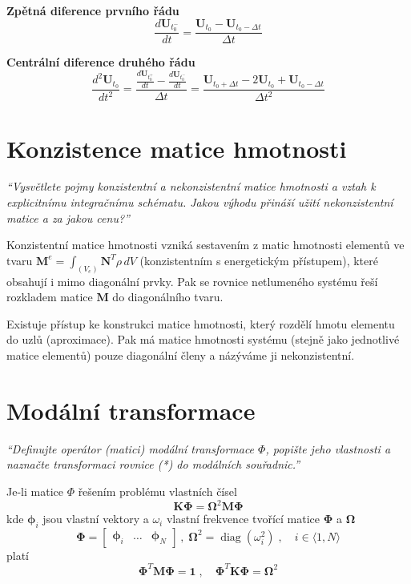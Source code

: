 \documentclass{article}
\begin{document}
	\textbf{Zpětná diference prvního řádu}
	\begin{equation}
		\frac{d\bm{U}_{t_0^-}}{dt} = \frac{\bm{U}_{t_0} - \bm{U}_{t_0-\Delta t}}{\Delta t}
	\end{equation}

	\textbf{Centrální diference druhého řádu}
	\begin{equation}
		\frac{d^2\bm{U}_{t_0}}{dt^2}
		=
		\frac{\frac{d\bm{U}_{t_0^+}}{dt} - \frac{d\bm{U}_{t_0^-}}{dt}}{\Delta t}
		=
		\frac{\bm{U}_{t_0+\Delta t} - 2\bm{U}_{t_0} + \bm{U}_{t_0-\Delta t}}{\Delta t^2}
	\end{equation}

	\section{Konzistence matice hmotnosti}
	\emph{``Vysvětlete pojmy konzistentní a nekonzistentní matice hmotnosti a vztah k explicitnímu integračnímu schématu. Jakou výhodu přináší užití nekonzistentní matice a za jakou cenu?''}

	Konzistentní matice hmotnosti vzniká sestavením z matic hmotnosti elementů ve tvaru $\bm{M}^e = \int_{(V_e)} \bm{N}^T \rho \, dV$ (konzistentním s energetickým přístupem), které obsahují i mimo diagonální prvky. Pak se rovnice netlumeného systému řeší rozkladem matice $\bm{M}$ do diagonálního tvaru.

	Existuje přístup ke konstrukci matice hmotnosti, který rozdělí hmotu elementu do uzlů (aproximace). Pak má matice hmotnosti systému (stejně jako jednotlivé matice elementů) pouze diagonální členy a názýváme ji nekonzistentní.

	\section{Modální transformace}
	\emph{``Definujte operátor (matici) modální transformace $\Phi$, popište jeho vlastnosti a naznačte transformaci rovnice (*) do modálních souřadnic.''}

	Je-li matice $\Phi$ řešením problému vlastních čísel
	\begin{equation}
		\bm{K}\bm{\Phi} = \bm{\Omega}^2 \bm{M} \bm{\Phi}
	\end{equation}
	kde $\bm{\phi}_i$ jsou vlastní vektory a $\omega_i$ vlastní frekvence tvořící matice $\bm{\Phi}$ a $\bm{\Omega}$  
	\begin{equation}
		\bm{\Phi} = \begin{bmatrix} \bm{\phi}_i & \dots & \bm{\phi}_N \end{bmatrix}
		\,,\;
		\bm{\Omega}^2 = \operatorname{diag}(\omega_i^2)
		\;,\quad 
		i \in \langle 1,N \rangle
	\end{equation}
	platí
	\begin{equation}
		\bm{\Phi}^T\bm{M}\bm{\Phi} = \bm{1}
		\;,\quad 
		\bm{\Phi}^T\bm{K}\bm{\Phi} = \bm{\Omega}^2
	\end{equation}
\end{document}
